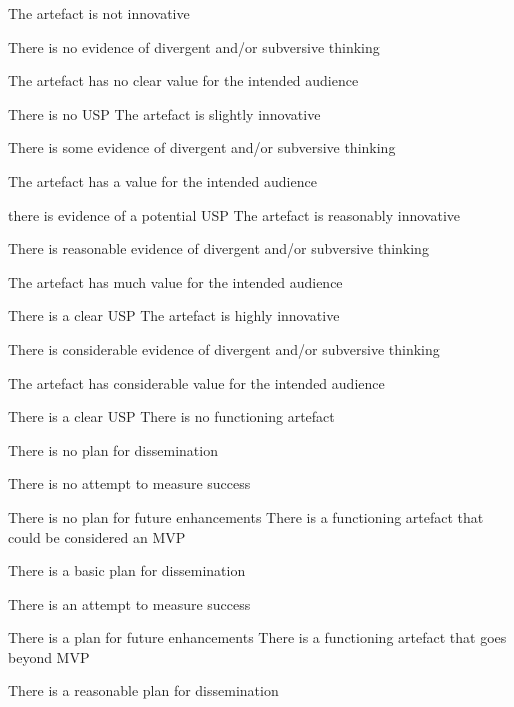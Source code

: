 \begin{markingrubric}
        \grade\fail 	The artefact is not innovative
            \par		There is no evidence of divergent and/or subversive thinking 
            \par        The artefact has no clear value for the intended audience 
            \par        There is no USP
        \grade   	The artefact is slightly innovative
            \par	There is some evidence of divergent and/or subversive thinking 
            \par    The artefact has a value for the intended audience 
            \par    there is evidence of a potential USP
        \grade   	The artefact is reasonably innovative
            \par	There is reasonable evidence of divergent and/or subversive thinking 
            \par    The artefact has much value for the intended audience
            \par    There is a clear USP
        \grade   	The artefact is highly innovative
            \par	There is considerable evidence of divergent and/or subversive thinking 
            \par    The artefact has considerable value for the intended audience 
            \par    There is a clear USP 
        \grade\fail 	There is no functioning artefact
            \par		There is no plan for dissemination
            \par        There is no attempt to measure success
            \par        There is no plan for future enhancements
        \grade      	There is a functioning artefact that could be considered an MVP
            \par		There is a basic plan for dissemination
            \par        There is an attempt to measure success
            \par        There is a plan for future enhancements
        \grade      	There is a functioning artefact that goes beyond MVP
            \par		There is a reasonable plan for dissemination

\end{markingrubric}
